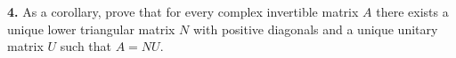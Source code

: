 \documentclass[11pt]{amsart}
\theoremstyle{definition}  %
\newcommand{\R}{\mathbb{R}}
\begin{document}
\vskip 0.1cm
\noindent
{\bf 4.}  As a corollary, prove that for every complex invertible matrix $A$ there exists a unique lower triangular matrix $N$ with positive diagonals and a unique unitary matrix $U$
such that $A = NU$. \\







%
\end{document}
